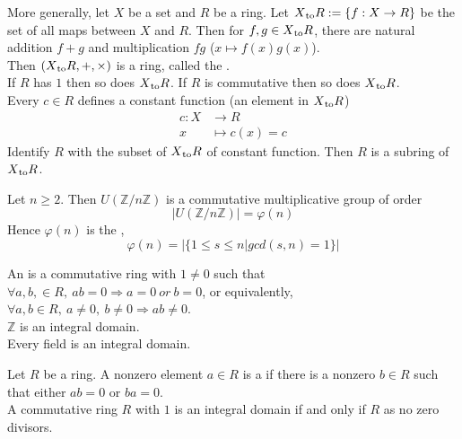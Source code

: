 \begin{remark}
More generally, let $X$ be a set and $R$ be a ring. Let $X \textsubscript{to} R := \{f: X \rightarrow R\}$ be the set of all maps between $X$ and $R$. Then for $f, g \in X \textsubscript{to} R $, there are natural addition $f+g$ and multiplication $fg$ ($x\mapsto f(x)g(x)$).\\
Then $(X \textsubscript{to} R, +, \times)$ is a ring, called the .\\
If $R$ has $1$ then so does $X \textsubscript{to} R$. If $R$ is commutative then so does $X \textsubscript{to} R$.\\
Every $c\in R$ defines a constant function (an element in $X \textsubscript{to} R$)
\begin{align}
c:X &\rightarrow R \nonumber \\
x &\mapsto c(x)=c \nonumber
\end{align}
Identify $R$ with the subset of $X \textsubscript{to} R$ of constant function. Then $R$ is a subring of $X \textsubscript{to} R$.\\
\end{remark}


\begin{remark}
Let $n \geq 2$. Then $U(\mathbb{Z}/n\mathbb{Z})$ is a commutative multiplicative group of order 
\begin{equation}
\left| U(\mathbb{Z}/n\mathbb{Z}) \right| = \varphi (n) \nonumber
\end{equation}
Hence $\varphi (n)$ is the , 
\begin{equation}
\varphi (n)=\left|\{1 \leq s \leq n | gcd(s, n) = 1\}\right| \nonumber
\end{equation}
\end{remark}


\begin{definition}
An  is a commutative ring with $1\neq 0$ such that $\forall a, b, \in R, \ ab = 0 \Rightarrow a=0 \ or \ b=0$,
or equivalently, $\forall a, b \in R, \ a \neq 0, \ b \neq 0 \Rightarrow ab \neq 0$.\\
$\mathbb{Z}$ is an integral domain.\\
Every field is an integral domain.\\
\end{definition}


\begin{definition}
Let $R$ be a ring. A nonzero element $a \in R$ is a 	 if there is a nonzero $b\in R$ such that either $ab=0$ or $ba=0$.\\
A commutative ring $R$ with $1$ is an integral domain if and only if $R$ as no zero divisors.\\
\end{definition}



